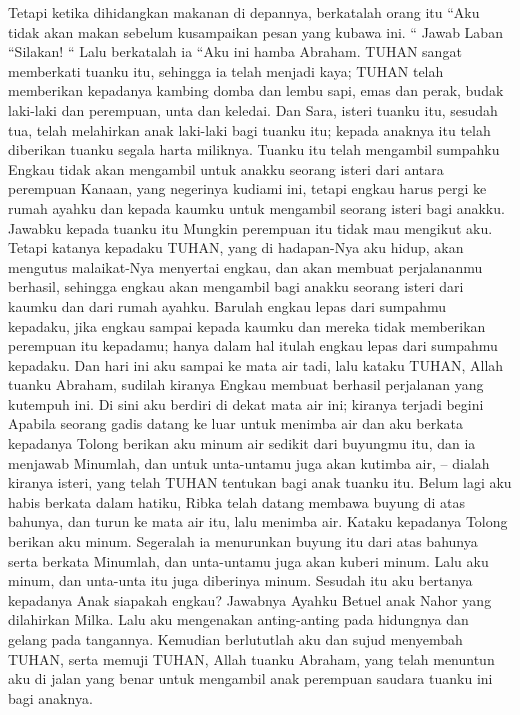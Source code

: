 \begin{biblechapter}
\verse Tetapi ketika dihidangkan makanan di depannya, berkatalah orang itu “Aku tidak akan makan sebelum kusampaikan pesan yang kubawa ini. “ Jawab Laban “Silakan! “
\verse Lalu berkatalah ia “Aku ini hamba Abraham.
\verse TUHAN sangat memberkati tuanku itu, sehingga ia telah menjadi kaya; TUHAN telah memberikan kepadanya kambing domba dan lembu sapi, emas dan perak, budak laki-laki dan perempuan, unta dan keledai.
\verse Dan Sara, isteri tuanku itu, sesudah tua, telah melahirkan anak laki-laki bagi tuanku itu; kepada anaknya itu telah diberikan tuanku segala harta miliknya.
\verse Tuanku itu telah mengambil sumpahku Engkau tidak akan mengambil untuk anakku seorang isteri dari antara perempuan Kanaan, yang negerinya kudiami ini,
\verse tetapi engkau harus pergi ke rumah ayahku dan kepada kaumku untuk mengambil seorang isteri bagi anakku.
\verse Jawabku kepada tuanku itu Mungkin perempuan itu tidak mau mengikut aku.
\verse Tetapi katanya kepadaku TUHAN, yang di hadapan-Nya aku hidup, akan mengutus malaikat-Nya menyertai engkau, dan akan membuat perjalananmu berhasil, sehingga engkau akan mengambil bagi anakku seorang isteri dari kaumku dan dari rumah ayahku.
\verse Barulah engkau lepas dari sumpahmu kepadaku, jika engkau sampai kepada kaumku dan mereka tidak memberikan perempuan itu kepadamu; hanya dalam hal itulah engkau lepas dari sumpahmu kepadaku.
\verse Dan hari ini aku sampai ke mata air tadi, lalu kataku TUHAN, Allah tuanku Abraham, sudilah kiranya Engkau membuat berhasil perjalanan yang kutempuh ini.
\verse Di sini aku berdiri di dekat mata air ini; kiranya terjadi begini Apabila seorang gadis datang ke luar untuk menimba air dan aku berkata kepadanya Tolong berikan aku minum air sedikit dari buyungmu itu,
\verse dan ia menjawab Minumlah, dan untuk unta-untamu juga akan kutimba air, -- dialah kiranya isteri, yang telah TUHAN tentukan bagi anak tuanku itu.
\verse Belum lagi aku habis berkata dalam hatiku, Ribka telah datang membawa buyung di atas bahunya, dan turun ke mata air itu, lalu menimba air. Kataku kepadanya Tolong berikan aku minum.
\verse Segeralah ia menurunkan buyung itu dari atas bahunya serta berkata Minumlah, dan unta-untamu juga akan kuberi minum. Lalu aku minum, dan unta-unta itu juga diberinya minum.
\verse Sesudah itu aku bertanya kepadanya Anak siapakah engkau? Jawabnya Ayahku Betuel anak Nahor yang dilahirkan Milka. Lalu aku mengenakan anting-anting pada hidungnya dan gelang pada tangannya.
\verse Kemudian berlututlah aku dan sujud menyembah TUHAN, serta memuji TUHAN, Allah tuanku Abraham, yang telah menuntun aku di jalan yang benar untuk mengambil anak perempuan saudara tuanku ini bagi anaknya.

\end{biblechapter}
